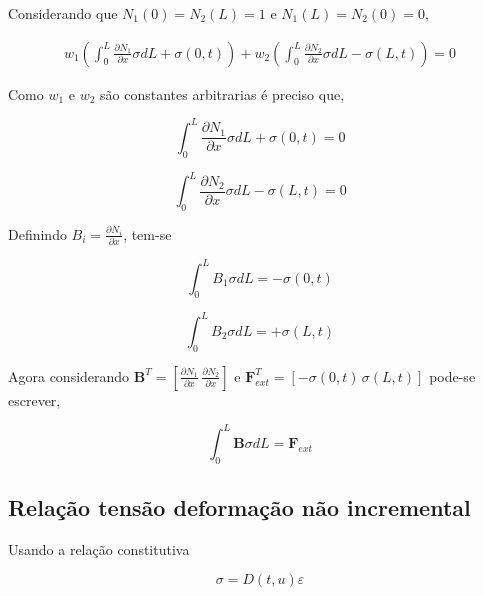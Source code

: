 \documentclass[12pt,a4paper]{article}
\newcommand{\diff}[1]{d#1}
\newcommand{\dd}[2]{\frac{\partial #1}{\partial #2}}
\begin{document}
Considerando que $N_1(0) = N_2(L) = 1$ e $N_1(L) = N_2(0) = 0$,

\begin{equation}
\begin{split}
w_1\left( \int_0^L \dd{N_1}{x}\sigma \diff{L} + \sigma\left(0, t\right) \right) +
w_2\left( \int_0^L \dd{N_2}{x}\sigma \diff{L} - \sigma\left(L, t\right) \right) = 0
\end{split}
\end{equation}
	
Como $w_1$ e $w_2$ são constantes arbitrarias é preciso que,

\begin{equation}
\int_0^L \dd{N_1}{x}\sigma \diff{L} + \sigma\left(0, t\right) = 0
\label{eq_u1}
\end{equation}

\begin{equation}
\int_0^L \dd{N_2}{x}\sigma \diff{L} - \sigma\left(L, t\right) = 0
\label{eq_u2}
\end{equation}
 
Definindo $B_i = \dd{N_i}{x}$, tem-se

\begin{equation}
\int_0^L B_1\sigma \diff{L}  = -\sigma\left(0,t\right)
\label{eq_sigma1_final}
\end{equation}

\begin{equation}
\int_0^L B_2\sigma \diff{L}  = + \sigma\left(L,t\right)
\label{eq_sigma2_final}
\end{equation}
 
Agora considerando $\mathbf{B}^T = [\dd{N_1}{x}\,\dd{N_2}{x}]$ e $\mathbf{F}^T_{ext} = [-\sigma\left(0,t\right)\,\sigma\left(L,t\right)]$ pode-se escrever,

\begin{equation}
\int_0^L \mathbf{B} \sigma \diff{L}  = \mathbf{F}_{ext}
\label{eq_sigma_matricial}
\end{equation}
 
 
 
\subsection{Relação tensão deformação não incremental}

Usando a relação constitutiva 

\begin{equation}
\sigma = D\left(t,u\right) \varepsilon  
\label{eq_t_defor}
\end{equation}
 
\end{document}
